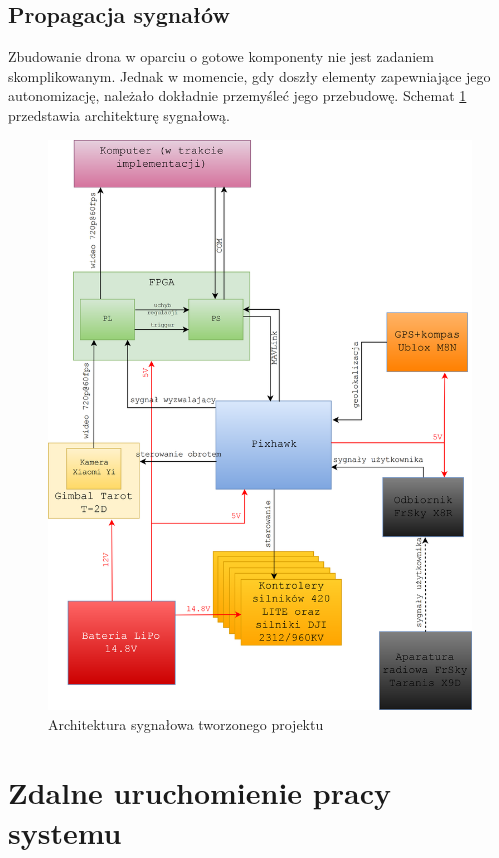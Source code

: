 \subsection{Propagacja sygnałów}
Zbudowanie drona w oparciu o gotowe komponenty nie jest zadaniem skomplikowanym. Jednak w momencie, gdy doszły elementy zapewniające jego autonomizację, należało dokładnie przemyśleć jego przebudowę. Schemat \ref{fig:architecture} przedstawia architekturę sygnałową.
\begin{figure}[]
	\centering
	\includegraphics[width=14cm]{5_drone_architecture.png}
	\caption{Architektura sygnałowa tworzonego projektu}
	\label{fig:architecture}
\end{figure}

\section{Zdalne uruchomienie pracy systemu}

